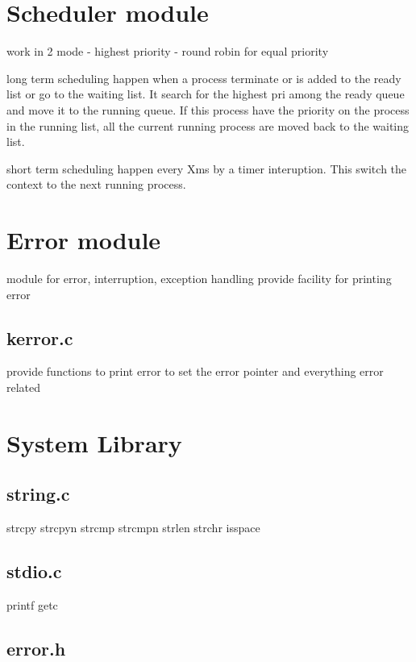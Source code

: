\section{Scheduler module}

work in 2 mode
- highest priority
- round robin for equal priority

long term scheduling happen when a process terminate or is added to the ready list or go to the waiting list.
It search for the highest pri among the ready queue and move it to the running queue. If this process have the priority on the process in the running list, all the current running process are moved back to the waiting list.

short term scheduling happen every Xms by a timer interuption. This switch the context to the next running process.

\section{Error module}

module for error, interruption, exception handling
provide facility for printing error

\subsection{kerror.c}

provide functions to print error to set the error pointer and everything error related

\section{System Library}

\subsection{string.c}

strcpy
strcpyn
strcmp
strcmpn
strlen
strchr
isspace

\subsection{stdio.c}

printf
getc

\subsection{error.h}

